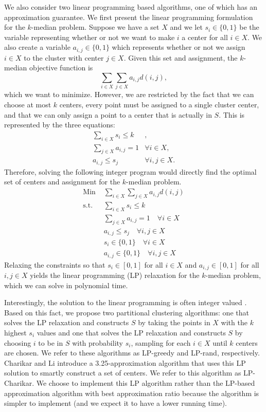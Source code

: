 \documentclass[conference, 10pt, final]{IEEEtran}
\begin{document}
We also consider two linear programming based algorithms, one of which has an approximation guarantee. We first present the linear programming formulation for the $k$-median problem. Suppose we have a set $X$ and we let $s_i \in \{0,1\}$ be the variable representing whether or not we want to make $i$ a center for all $i \in X$. We also create a variable $a_{i,j} \in \{0, 1\}$ which represents whether or not we assign $i \in X$ to the cluster with center $j \in X$. Given this set and assignment, the $k$-median objective function is 
\begin{equation}
\sum_{i \in X} \sum_{j \in X} a_{i,j} d(i,j), 
\end{equation}
which we want to minimize. However, we are restricted by the fact that we can choose at most $k$ centers, every point must be assigned to a single cluster center, and that we can only assign a point to a center that is actually in $S$. This is represented by the three equations:
\begin{eqnarray}
\sum_{i \in X} s_i   \leq k & ,\\
\sum_{j \in X} a_{i,j}  = 1 & \forall i \in X, \\
a_{i,j}   \leq s_j & \forall i, j \in X.
\end{eqnarray}
Therefore, solving the following integer program would directly find the optimal set of centers and assignment for the $k$-median problem.
\begin{eqnarray}
\text{Min } & \sum_{i \in X} \sum_{j \in X} a_{i,j} d(i,j) \\
\text{s.t. } & \sum_{i \in X} s_i   \leq k  \\
& \sum_{j \in X} a_{i,j}  = 1 \quad \forall i \in X \\
& a_{i,j}   \leq s_j \quad \forall i, j \in X \\
& s_i \in \{0,1\} \quad \forall i \in X \\
& a_{i,j} \in \{0,1\} \quad \forall i, j \in X
\end{eqnarray}
Relaxing the constraints so that $s_i \in [0,1]$ for all $i \in X$ and $a_{i,j} \in [0,1]$ for all $i,j \in X$ yields the linear programming (LP) relaxation for the $k$-median problem, which we can solve in polynomial time.

Interestingly, the solution to the linear programming is often integer valued \cite{Nagarajan}. Based on this fact, we propose two partitional clustering algorithms: one that solves the LP relaxation and constructs $S$ by taking the points in $X$ with the $k$ highest $s_i$ values and one that solves the LP relaxation and constructs $S$ by choosing $i$ to be in $S$ with probability $s_i$, sampling for each $i \in X$ until $k$ centers are chosen. We refer to these algorithms as LP-greedy and LP-rand, respectively.
Charikar and Li \cite{Charikar} introduce a 3.25-approximation algorithm that uses this LP solution to smartly construct a set of centers. We refer to this algorithm as LP-Charikar. We choose to implement this LP algorithm rather than the LP-based approximation algorithm with best approximation ratio because the algorithm is simpler to implement (and we expect it to have a lower running time). 
\end{document}
